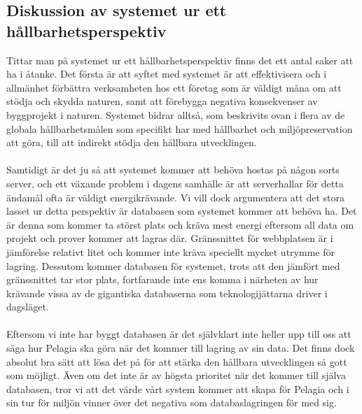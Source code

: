 \subsection{Diskussion av systemet ur ett hållbarhetsperspektiv}

Tittar man på systemet ur ett hållbarhetsperspektiv finns det ett antal saker att ha i åtanke. Det första är att syftet med systemet är att effektivisera och i allmänhet förbättra verksamheten hos ett företag som är väldigt måna om att stödja och skydda naturen, samt att förebygga negativa konsekvenser av byggprojekt i naturen. Systemet bidrar alltså, som beskrivits ovan i flera av de globala hållbarhetsmålen som specifikt har med hållbarhet och miljöpreservation att göra, till att indirekt stödja den hållbara utvecklingen.
\\
\\
Samtidigt är det ju så att systemet kommer att behöva hostas på någon sorts server, och ett växande problem i dagens samhälle är att serverhallar för detta ändamål ofta är väldigt energikrävande. Vi vill dock argumentera att det stora lasset ur detta perspektiv är databasen som systemet kommer att behöva ha. Det är denna som kommer ta störst plats och kräva mest energi eftersom all data om projekt och prover kommer att lagras där. Gränssnittet för webbplatsen är i jämförelse relativt litet och kommer inte kräva speciellt mycket utrymme för lagring. Dessutom kommer databasen för systemet, trots att den jämfört med gränssnittet tar stor plats, fortfarande inte ens komma i närheten av hur krävande vissa av de gigantiska databaserna som teknologijättarna driver i dagsläget.
\\
\\
Eftersom vi inte har byggt databasen är det självklart inte heller upp till oss att säga hur Pelagia ska göra när det kommer till lagring av sin data. Det finns dock absolut bra sätt att lösa det på för att stärka den hållbara utvecklingen så gott som möjligt. Även om det inte är av högsta prioritet när det kommer till själva databasen, tror vi att det värde vårt system kommer att skapa för Pelagia och i sin tur för miljön vinner över det negativa som databaslagringen för med sig.